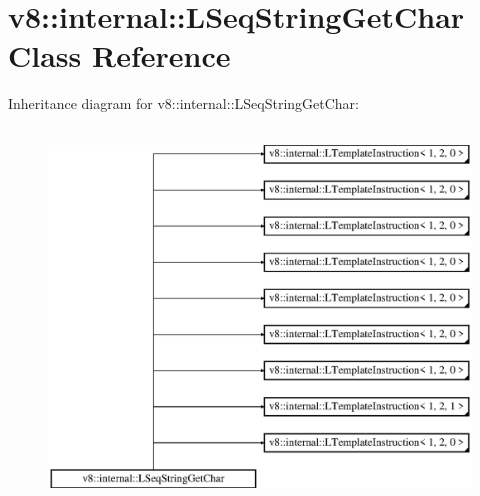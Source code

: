\hypertarget{classv8_1_1internal_1_1_l_seq_string_get_char}{}\section{v8\+:\+:internal\+:\+:L\+Seq\+String\+Get\+Char Class Reference}
\label{classv8_1_1internal_1_1_l_seq_string_get_char}
Inheritance diagram for v8\+:\+:internal\+:\+:L\+Seq\+String\+Get\+Char\+:\begin{figure}[H]
\begin{center}
\leavevmode
\includegraphics[height=10.000000cm]{classv8_1_1internal_1_1_l_seq_string_get_char}
\end{center}
\end{figure}
